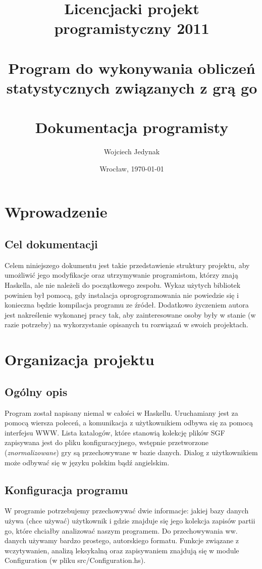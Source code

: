 \documentclass[10pt,leqno]{article}
\title{\LARGE Licencjacki projekt programistyczny 2011 \\ 
       \ \\
       Program do wykonywania obliczeń statystycznych związanych z grą go \\ 
       \ \\
       Dokumentacja programisty }
\author{Wojciech Jedynak}
\date{Wrocław, \today}
\begin{document}
\maketitle 

\thispagestyle{empty}
\tableofcontents

\newpage

\section{Wprowadzenie}

\subsection{Cel dokumentacji}
Celem niniejszego dokumentu jest takie przedstawienie struktury projektu, aby umożliwić jego modyfikacje oraz utrzymywanie programistom, którzy
znają Haskella, ale nie należeli do początkowego zespołu. Wykaz użytych bibliotek powinien był pomocą, gdy instalacja oprogrogramowania nie powiedzie się i 
konieczna będzie kompilacja programu ze źródeł. Dodatkowo życzeniem autora jest nakreślenie wykonanej pracy tak, aby zainteresowane osoby
były w stanie (w razie potrzeby) na wykorzystanie opisanych tu rozwiązań w swoich projektach.

\section{Organizacja projektu}

\subsection{Ogólny opis}
Program został napisany niemal w całości w Haskellu. Uruchamiany jest za pomocą wiersza poleceń, a komunikacja z użytkownikiem
odbywa się za pomocą interfejsu WWW. Lista katalogów, które stanowią kolekcję plików SGF zapisywana jest do pliku konfiguracyjnego,
wstępnie przetworzone (\emph{znormalizowane}) gry są przechowywane w bazie danych. Dialog z użytkownikiem może odbywać się w języku
polskim bądź angielskim.

\subsection{Konfiguracja programu}

W programie potrzebujemy przechowywać dwie informacje: jakiej bazy danych używa (chce używać) użytkownik i gdzie znajduje się jego
kolekcja zapisów partii go, które chciałby analizować naszym programem. Do przechowywania ww. danych używamy bardzo prostego, 
autorskiego formatu. Funkcje związane z wczytywanien, analizą leksykalną oraz zapisywaniem znajdują się w module Configuration 
(w pliku src/Configuration.hs).
\end{document}
